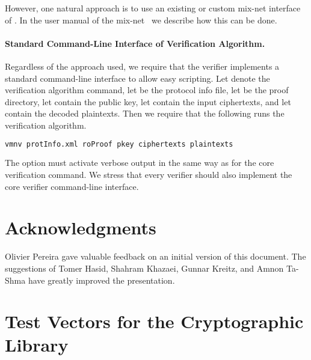\documentclass[11pt]{article}
\begin{document}
However, one natural approach is to use an existing or custom mix-net
interface of \veri. In the user manual of the \veri
mix-net~\cite{vmnum} we describe how this can be done.


\paragraph{Standard Command-Line Interface of Verification Algorithm.}

Regardless of the approach used, we require that the verifier
implements a standard command-line interface to allow easy
scripting. Let  denote the verification algorithm command,
let  be the protocol info file, let 
be the proof directory, let  contain the public key,
let  contain the input ciphertexts, and let
 contain the decoded plaintexts. Then we require that
the following runs the verification algorithm.

\vspace{0.3cm}
\begin{lstlisting}[frame=single,language=xml,
basicstyle=\tt,showstringspaces=false]
vmnv protInfo.xml roProof pkey ciphertexts plaintexts
\end{lstlisting}

\vspace{0.2cm}
\noindent
The  option must activate verbose output in the same way as
for the core verification command. We stress that every verifier
should also implement the core verifier command-line interface.


\section{Acknowledgments}

Olivier Pereira gave valuable feedback on an initial version of this
document. The suggestions of Tomer Hasid, Shahram Khazaei, Gunnar
Kreitz, and Amnon Ta-Shma have greatly improved the presentation.






\appendix

\section{Test Vectors for the Cryptographic Library}


\end{document}
